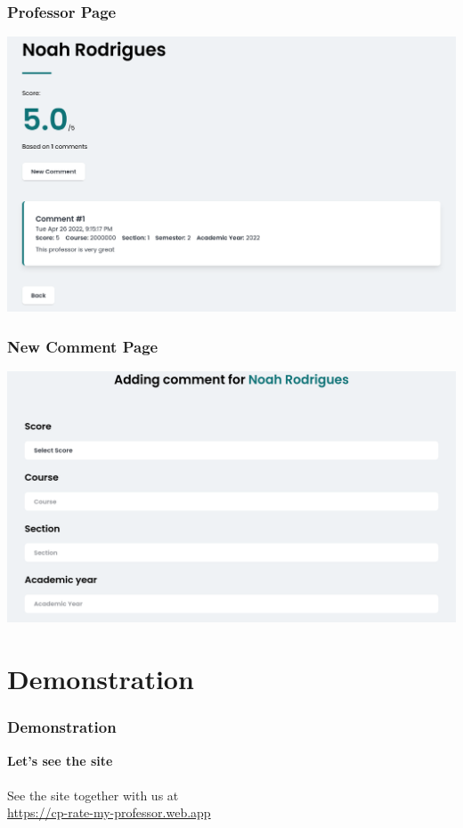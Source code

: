 \documentclass[aspectratio=169]{beamer}
\begin{document}
\begin{frame}
    \frametitle{Professor Page}
    \centering
    \includegraphics[scale=0.25]{ratemyprof_prof.png}
\end{frame}
\begin{frame}
    \frametitle{New Comment Page}
    \centering
    \includegraphics[scale=0.25]{ratemyprof_comment.png}
\end{frame}
\section{Demonstration}
\begin{frame}
    \frametitle{Demonstration}
    \centering
    {\huge\textbf{Let's see the site}}\\~\\
    See the site together with us at \\
    {\color{blue}\url{https://cp-rate-my-professor.web.app}}
\end{frame}
\end{document}
